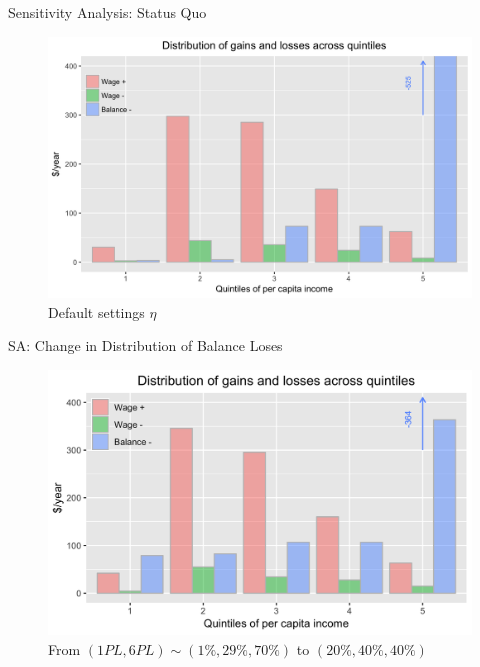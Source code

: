 \documentclass{beamer}
\def\white{\color{white}}
\begin{document}
\begin{frame}[noframenumbering]{Sensitivity Analysis: Status Quo}
\begin{figure}[h!]
\centering
\hspace*{-3em}
\includegraphics[scale = 0.17]{../Images/policy_est}
\caption{Default settings {\white $ \eta $} }
\end{figure}	
\end{frame}

\begin{frame}{SA: Change in Distribution of Balance Loses}
\begin{figure}[h!]
\centering
\hspace*{-3em}
\includegraphics[scale = 0.17]{../Images/policy_est_bl_204040}
\caption{From $(1PL, 6PL) \sim (1\%, 29\%, 70\%)$ to  $(20\%, 40\%, 40\%)$}
\end{figure}	
\end{frame}
\end{document}
